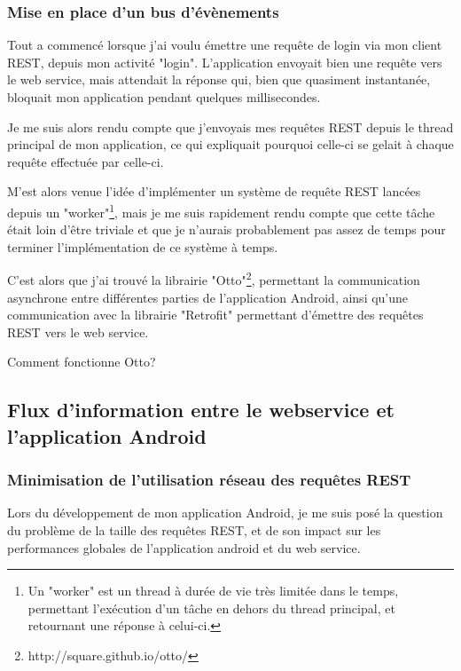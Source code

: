 \documentclass[12pt,table,a4paper]{report}
\begin{document}


\subsubsection{Mise en place d'un bus d'évènements}
Tout a commencé lorsque j'ai voulu émettre une requête de login via mon client REST, depuis mon activité "login". L'application envoyait bien une requête vers le web service, mais attendait la réponse qui, bien que quasiment instantanée, bloquait mon application pendant quelques millisecondes.

Je me suis alors rendu compte que j'envoyais mes requêtes REST depuis le thread principal de mon application, ce qui expliquait pourquoi celle-ci se gelait à chaque requête effectuée par celle-ci.

M'est alors venue l'idée d'implémenter un système de requête REST lancées depuis un "worker"\footnote{Un "worker" est un thread à durée de vie très limitée dans le temps, permettant l'exécution d'un tâche en dehors du thread principal, et retournant une réponse à celui-ci.}, mais je me suis rapidement rendu compte que cette tâche était loin d'être triviale et que je n'aurais probablement pas assez de temps pour terminer l'implémentation de ce système à temps.

C'est alors que j'ai trouvé la librairie "Otto"\footnote{http://square.github.io/otto/}, permettant la communication asynchrone entre différentes parties de l'application Android, ainsi qu'une communication avec la librairie "Retrofit" permettant d'émettre des requêtes REST vers le web service.

\begin{center}
Comment fonctionne Otto?
\end{center}

\todo{}


\subsection{Flux d'information entre le webservice et l'application Android}


\subsubsection{Minimisation de l'utilisation réseau des requêtes REST} \label{sssec:minimisation-utilisation-reseau}
Lors du développement de mon application Android, je me suis posé la question du problème de la taille des requêtes REST, et de son impact sur les performances globales de l'application android et du web service.
\end{document}
